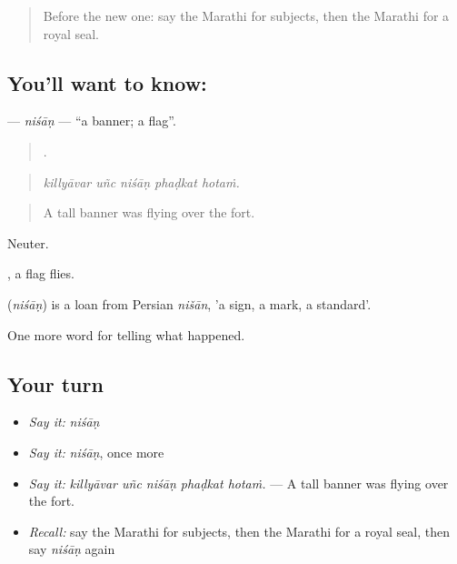 \label{lesson:MR-C327-nisan}



\begin{quote}
Before the new one: say the Marathi for subjects, then the Marathi for a royal seal.
\end{quote}

\subsection*{You'll want to know: }
\textbf{} — \emph{niśāṇ} — \textquotedblleft{}a banner; a flag\textquotedblright{}.

\begin{quote}
    .
\end{quote}

\begin{quote}
\emph{killyāvar uñc niśāṇ phaḍkat hotaṁ.}
\end{quote}

\begin{quote}
A tall banner was flying over the fort.
\end{quote}

Neuter.

 , a flag flies.

\begin{cousinweb}
\textbf{} (\emph{niśāṇ}) is a loan from Persian \emph{nišān}, 'a sign, a mark, a standard'.
\end{cousinweb}

\begin{grammarlens}[title={What you've built}]
One more word for telling what happened.
\end{grammarlens}

\subsection*{Your turn}
\begin{itemize}
\raggedright
  \item \emph{Say it:} \emph{niśāṇ}
  \item \emph{Say it:} \emph{niśāṇ}, once more
  \item \emph{Say it:} \emph{killyāvar uñc niśāṇ phaḍkat hotaṁ.} — A tall banner was flying over the fort.
  \item \emph{Recall:} say the Marathi for subjects, then the Marathi for a royal seal, then say \emph{niśāṇ} again
\end{itemize}

